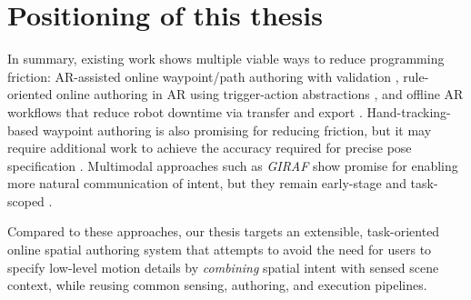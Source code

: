 \section{Positioning of this thesis}

In summary, existing work shows multiple viable ways to reduce programming friction: AR-assisted online waypoint/path authoring with validation \cite{Ong2020}, rule-oriented online authoring in AR using trigger-action abstractions \cite{Ikeda2024}, and offline AR workflows that reduce robot downtime via transfer and export \cite{Muller2024}. Hand-tracking-based waypoint authoring is also promising for reducing friction, but it may require additional work to achieve the accuracy required for precise pose specification \cite{Vysocky2023}. Multimodal approaches such as \emph{GIRAF} show promise for enabling more natural communication of intent, but they remain early-stage and task-scoped \cite{Lin2023}.

Compared to these approaches, our thesis targets an extensible, task-oriented online spatial authoring system that attempts to avoid the need for users to specify low-level motion details by \emph{combining} spatial intent with sensed scene context, while reusing common sensing, authoring, and execution pipelines.
